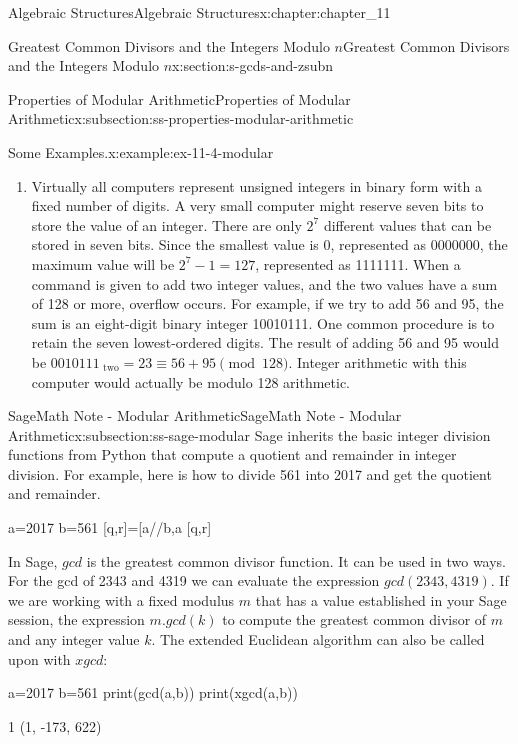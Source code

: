 \documentclass[oneside,10pt,]{book}
\numberwithin{equation}{section}
\begin{document}
\begin{chapterptx}{Algebraic Structures}{}{Algebraic Structures}{}{}{x:chapter:chapter_11}
\begin{sectionptx}{Greatest Common Divisors  and the Integers Modulo \(n\)}{}{Greatest Common Divisors  and the Integers Modulo \(n\)}{}{}{x:section:s-gcds-and-zsubn}
\begin{subsectionptx}{Properties of Modular Arithmetic}{}{Properties of Modular Arithmetic}{}{}{x:subsection:ss-properties-modular-arithmetic}
\begin{example}{Some Examples.}{x:example:ex-11-4-modular}
\begin{enumerate}[label=(\alph*)]
\item{}Virtually all computers represent unsigned integers in binary form with a fixed number of digits. A very small computer might reserve seven bits to store the value of an integer. There are only \(2^7\) different values that can be stored in seven bits. Since the smallest value is 0, represented as 0000000, the maximum value will be \(2^7 - 1 = 127\), represented as 1111111. When a command is given to add two integer values, and the two values have a sum of 128 or more, overflow occurs. For example, if we try to add 56 and 95, the sum is an eight-digit binary integer 10010111. One common procedure is to retain the seven lowest-ordered digits. The result of adding 56 and 95 would be \(0010111_{\textrm{ two}} = 23 \equiv  56 + 95\pmod{128}\). Integer arithmetic with this computer would actually be modulo 128 arithmetic.%
\end{enumerate}
%
\end{example}
\end{subsectionptx}
%
%
\typeout{************************************************}
\typeout{************************************************}
%
\begin{subsectionptx}{SageMath Note - Modular Arithmetic}{}{SageMath Note - Modular Arithmetic}{}{}{x:subsection:ss-sage-modular}
%
Sage inherits the basic integer division functions from Python that compute a quotient and remainder in integer division.  For example, here is how to divide 561 into 2017 and get the quotient and remainder.%
\begin{sageinput}
a=2017
b=561
[q,r]=[a//b,a%
[q,r]
\end{sageinput}
\begin{sageoutput}
[3, 334]
\end{sageoutput}
In Sage, \(gcd\) is the greatest common divisor function.  It can be used in two ways.  For the gcd of 2343 and 4319 we can evaluate the expression \(gcd(2343,4319)\).   If we are working with a fixed modulus \(m\) that has a value established in your Sage session, the expression \(m.gcd(k)\) to compute the greatest common divisor of \(m\) and any integer value \(k\). The extended Euclidean algorithm can also be called upon with \(xgcd\):%
\begin{sageinput}
a=2017
b=561
print(gcd(a,b))
print(xgcd(a,b))
\end{sageinput}
\begin{sageoutput}
1
(1, -173, 622)

\end{sageoutput}
\end{subsectionptx}
\end{sectionptx}
\end{chapterptx}
\end{document}
